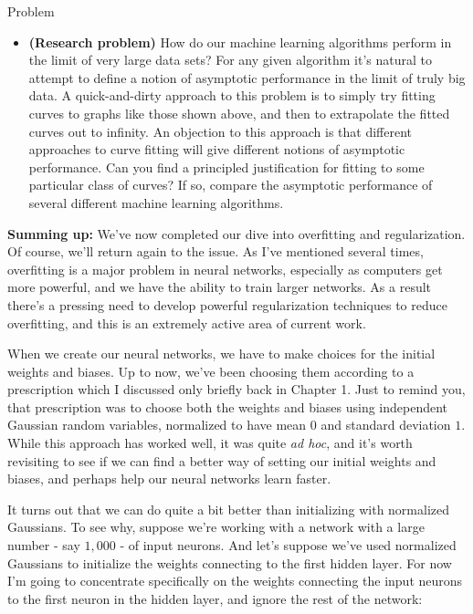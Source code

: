 \begin{exerciseBox}{Problem}


\begin{itemize}

\item \textbf{(Research problem)} How do our machine learning algorithms perform in the limit of very large data sets? For any given algorithm it's natural to attempt to define a notion of asymptotic performance in the limit of truly big data. A quick-and-dirty approach to this problem is to simply try fitting curves to graphs like those shown above, and then to extrapolate the fitted curves out to infinity. An objection to this approach is that different approaches to curve fitting will give different notions of asymptotic performance. Can you find a principled justification for fitting to some particular class of curves? If so, compare the asymptotic performance of several different machine learning algorithms.

\end{itemize}


\textbf{Summing up:} We've now completed our dive into overfitting and regularization. Of course, we'll return again to the issue. As I've mentioned several times, overfitting is a major problem in neural networks, especially as computers get more powerful, and we have the ability to train larger networks. As a result there's a pressing need to develop powerful regularization techniques to reduce overfitting, and this is an extremely active area of current work.

\end{exerciseBox}





When we create our neural networks, we have to make choices for the initial weights and biases. Up to now, we've been choosing them according to a prescription which I discussed only briefly back in Chapter 1. Just to remind you, that prescription was to choose both the weights and biases using independent Gaussian random variables, normalized to have mean $0$ and standard deviation $1$. While this approach has worked well, it was quite \emph{ad hoc}, and it's worth revisiting to see if we can find a better way of setting our initial weights and biases, and perhaps help our neural networks learn faster.


It turns out that we can do quite a bit better than initializing with normalized Gaussians. To see why, suppose we're working with a network with a large number - say $1,000$ - of input neurons. And let's suppose we've used normalized Gaussians to initialize the weights connecting to the first hidden layer. For now I'm going to concentrate specifically on the weights connecting the input neurons to the first neuron in the hidden layer, and ignore the rest of the network:

